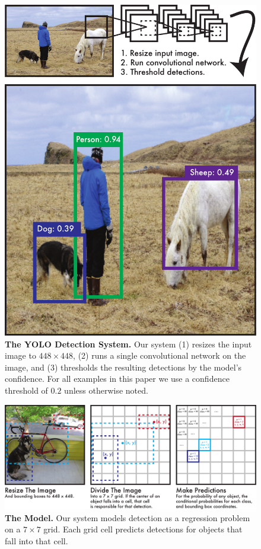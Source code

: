 \documentclass{article} %
\begin{document}
\begin{figure}[t]
\begin{center}
        \includegraphics[width=.9\linewidth]{system}
\end{center}
   \caption{\textbf{The YOLO Detection System.} Our system (1) resizes the input image to $448 \times 448$, (2) runs a single convolutional network on the image, and (3) thresholds the resulting detections by the model's confidence. For all examples in this paper we use a confidence threshold of $0.2$ unless otherwise noted.}
\label{system}
\end{figure}

\begin{figure}[t]
\begin{center}
        \includegraphics[width=.9\linewidth]{model}
\end{center}
   \caption{\textbf{The Model.} Our system models detection as a regression problem on a $7 \times 7$ grid. Each grid cell predicts detections for objects that fall into that cell.}
\label{model}
\end{figure}
\end{document}
